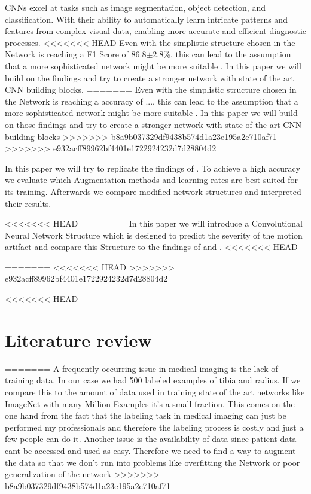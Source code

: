\documentclass[
a4paper, 
12pt,
grayscalebody, %
abstract=on,
twoside, BCOR10mm, 12pt, DIV13,headinclude, footexclude, final, abstracton, openright
]{ibireprt}
\numberwithin{equation}{chapter}
\numberwithin{table}{chapter}
\numberwithin{figure}{chapter}
\numberwithin{algorithm}{chapter}
\numberwithin{example}{chapter}
\numberwithin{example}{chapter}
\begin{document}
CNNs excel at tasks such as image segmentation, object detection, and classification. With their ability to automatically learn intricate patterns and features from complex visual data, enabling more accurate and efficient diagnostic processes. %
<<<<<<< HEAD
Even with the simplistic structure chosen in \cite{Walle2023} the Network is reaching a F1 Score of 86.8$\pm$2.8\%, this can lead to the assumption that a more sophisticated network might be more suitable . In this paper we will build on the findings and try to create a stronger network with state of the art CNN building blocks.  
=======
Even with the simplistic structure chosen in \cite{Sode2011} the Network is reaching a accuracy of ..., this can lead to the assumption that a more sophisticated network might be more suitable . In this paper we will build on those findings and try to create a stronger network with state of the art CNN building blocks 
>>>>>>> b8a9b037329df9438b574d1a23e195a2e710af71
>>>>>>> e932acff89962bf4401e1722924232d7d28804d2

In this paper we will try to replicate the findings of \cite{Walle2023}. To achieve a high accuracy we evaluate which Augmentation methods and learning rates are best suited for its training. Afterwards we compare modified network structures and interpreted their results. 

<<<<<<< HEAD
=======
In this paper we will introduce a Convolutional Neural Network Structure which is designed to predict the severity of the motion artifact and compare this Structure to the findings of \cite{Sode2011} and \cite{Walle2023}. 
<<<<<<< HEAD





=======
<<<<<<< HEAD
>>>>>>> e932acff89962bf4401e1722924232d7d28804d2


<<<<<<< HEAD
\chapter{Literature review}
=======
A frequently occurring issue in medical imaging is the lack of training data. In our case we had 500 labeled examples of tibia and radius. If we compare this to the amount of data used in training state of the art networks like ImageNet with many Million Examples it's a small fraction. This comes on the one hand from the fact that the labeling task in medical imaging can just be performed my professionals and therefore the labeling process is costly and just a few people can do it. Another issue is the availability of data since patient data cant be accessed and used as easy. Therefore we need to find a way to augment the data so that we don't run into problems like overfitting the Network or poor generalization of the network
>>>>>>> b8a9b037329df9438b574d1a23e195a2e710af71
\end{document}
